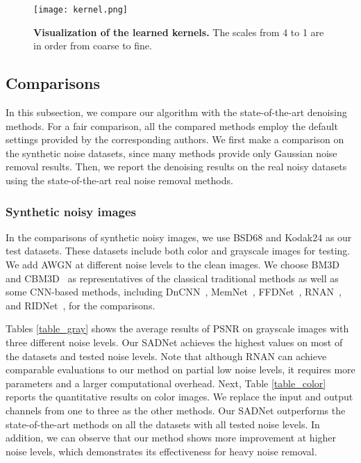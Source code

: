 \documentclass[runningheads]{llncs}
\begin{document}
\begin{figure}[t]
\begin{center}
\texttt{[image: kernel.png]}
\end{center}
\setlength{\abovecaptionskip}{0.cm}
   \caption{\textbf{Visualization of the learned kernels.} The scales from 4 to 1 are in order from coarse to fine.}
\label{fig_kernel}
\end{figure}

\subsection{Comparisons}

In this subsection, we compare our algorithm with the state-of-the-art denoising methods. For a fair comparison, all the compared methods employ the default settings provided by the corresponding authors. We first make a comparison on the synthetic noise datasets, since many methods provide only Gaussian noise removal results. Then, we report the denoising results on the real noisy datasets using the state-of-the-art real noise removal methods.

\subsubsection{Synthetic noisy images}

In the comparisons of synthetic noisy images, we use BSD68 and Kodak24 as our test datasets. These datasets include both color and grayscale images for testing. We add AWGN at different noise levels to the clean images. We choose BM3D~\cite{dabov2007image} and  CBM3D~\cite{dabov2007color} as representatives of the classical traditional methods as well as some CNN-based methods, including DnCNN~\cite{zhang2017beyond}, MemNet~\cite{tai2017memnet}, FFDNet~\cite{zhang2018ffdnet}, RNAN~\cite{zhang2019residual}, and  RIDNet~\cite{anwar2019real}, for the comparisons.

Tables \ref{table_gray} shows the average results of PSNR on grayscale images with three different noise levels. Our SADNet  achieves the highest values on most of the datasets and tested noise levels. Note that although RNAN can achieve comparable evaluations to our method on partial low noise levels, it requires more parameters and a larger computational overhead. Next, Table \ref{table_color} reports the quantitative results on color images. We replace the input and output channels from one to three as the other methods. Our SADNet outperforms the state-of-the-art methods on all the datasets with all tested noise levels. In addition, we can observe that our method shows more improvement at higher noise levels, which demonstrates its effectiveness for heavy noise removal. 
\end{document}

